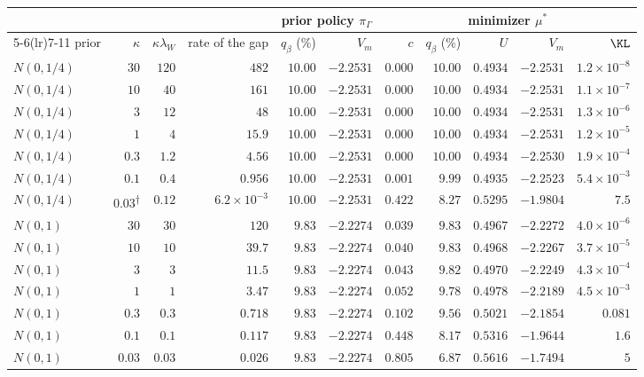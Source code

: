 \setlength{\tabcolsep}{3.5pt}\begin{tabular}{lrrrrrrrrrr}
\toprule
 & & & & \multicolumn{2}{c}{prior policy $\pi_\Gamma$} & \multicolumn{5}{c}{minimizer $\mu^*$} \\
\cmidrule(lr){5-6}\cmidrule(lr){7-11}
prior & $\kappa$ & $\kappa\lambda_W$ & rate of the gap & $q_\beta$ (\%) & $V_m$ & $c$ & $q_\beta$ (\%) & $U$ & $V_m$ & $\KL$ \\
\midrule
$N(0,1/4)$ & $30$ & $120$ & $482$ & $10.00$ & $-2.2531$ & $0.000$ & $10.00$ & $0.4934$ & $-2.2531$ & $1.2\times10^{-8}$ \\
$N(0,1/4)$ & $10$ & $40$ & $161$ & $10.00$ & $-2.2531$ & $0.000$ & $10.00$ & $0.4934$ & $-2.2531$ & $1.1\times10^{-7}$ \\
$N(0,1/4)$ & $3$ & $12$ & $48$ & $10.00$ & $-2.2531$ & $0.000$ & $10.00$ & $0.4934$ & $-2.2531$ & $1.3\times10^{-6}$ \\
$N(0,1/4)$ & $1$ & $4$ & $15.9$ & $10.00$ & $-2.2531$ & $0.000$ & $10.00$ & $0.4934$ & $-2.2531$ & $1.2\times10^{-5}$ \\
$N(0,1/4)$ & $0.3$ & $1.2$ & $4.56$ & $10.00$ & $-2.2531$ & $0.000$ & $10.00$ & $0.4934$ & $-2.2530$ & $1.9\times10^{-4}$ \\
$N(0,1/4)$ & $0.1$ & $0.4$ & $0.956$ & $10.00$ & $-2.2531$ & $0.001$ & $9.99$ & $0.4935$ & $-2.2523$ & $5.4\times10^{-3}$ \\
$N(0,1/4)$ & $0.03$\textsuperscript{$\dagger$} & $0.12$ & $6.2\times10^{-3}$ & $10.00$ & $-2.2531$ & $0.422$ & $8.27$ & $0.5295$ & $-1.9804$ & $7.5$ \\
$N(0,1)$ & $30$ & $30$ & $120$ & $9.83$ & $-2.2274$ & $0.039$ & $9.83$ & $0.4967$ & $-2.2272$ & $4.0\times10^{-6}$ \\
$N(0,1)$ & $10$ & $10$ & $39.7$ & $9.83$ & $-2.2274$ & $0.040$ & $9.83$ & $0.4968$ & $-2.2267$ & $3.7\times10^{-5}$ \\
$N(0,1)$ & $3$ & $3$ & $11.5$ & $9.83$ & $-2.2274$ & $0.043$ & $9.82$ & $0.4970$ & $-2.2249$ & $4.3\times10^{-4}$ \\
$N(0,1)$ & $1$ & $1$ & $3.47$ & $9.83$ & $-2.2274$ & $0.052$ & $9.78$ & $0.4978$ & $-2.2189$ & $4.5\times10^{-3}$ \\
$N(0,1)$ & $0.3$ & $0.3$ & $0.718$ & $9.83$ & $-2.2274$ & $0.102$ & $9.56$ & $0.5021$ & $-2.1854$ & $0.081$ \\
$N(0,1)$ & $0.1$ & $0.1$ & $0.117$ & $9.83$ & $-2.2274$ & $0.448$ & $8.17$ & $0.5316$ & $-1.9644$ & $1.6$ \\
$N(0,1)$ & $0.03$ & $0.03$ & $0.026$ & $9.83$ & $-2.2274$ & $0.805$ & $6.87$ & $0.5616$ & $-1.7494$ & $5$ \\

\end{tabular}
